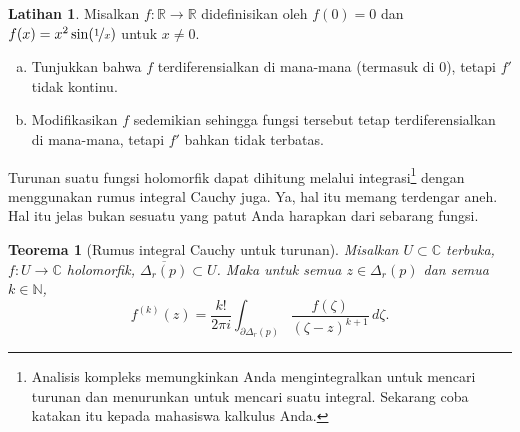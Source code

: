 \documentclass[12pt,openany]{book}
\newcommand{\C}{{\mathbb{C}}}
\newcommand{\R}{{\mathbb{R}}}
\newcommand{\N}{{\mathbb{N}}}
\theoremstyle{plain}
\newtheorem{thm}{Teorema}[section]
\theoremstyle{remark}
\theoremstyle{definition}
\newenvironment{exbox}{%
    \def\FrameCommand{\vrule width 1pt \relax\hspace{10pt}}%
    \MakeFramed{\advance\hsize-\width\FrameRestore}%
}{%
    \endMakeFramed
}
\newenvironment{exparts}{%
    \leavevmode\begin{enumerate}[a),noitemsep,topsep=0pt,parsep=0pt,partopsep=0pt]
}{%
    \end{enumerate}
}
\theoremstyle{exercise}
\newtheorem{exercise}{Latihan}[section]
\theoremstyle{example}
\begin{document}
\begin{exbox}
\begin{exercise}
Misalkan $f \colon \R \to \R$ didefinisikan oleh $f(0) = 0$ dan $f(x) = x^2
\sin( \nicefrac{1}{x} )$ untuk $x \neq 0$.
\begin{exparts}
\item
Tunjukkan bahwa $f$
terdiferensialkan di mana-mana (termasuk di $0$), tetapi $f'$ tidak kontinu.
\item
Modifikasikan $f$ sedemikian sehingga fungsi tersebut tetap terdiferensialkan di mana-mana, tetapi $f'$ bahkan
tidak terbatas.
\end{exparts}
\end{exercise}
\end{exbox}

Turunan suatu fungsi holomorfik dapat dihitung melalui
integrasi\footnote{Analisis kompleks memungkinkan Anda mengintegralkan untuk mencari
turunan dan menurunkan untuk mencari suatu integral.  Sekarang coba katakan itu kepada mahasiswa
kalkulus Anda.} dengan menggunakan rumus integral Cauchy juga.  Ya, hal itu memang terdengar
aneh.  Hal itu jelas bukan sesuatu yang patut Anda harapkan dari sebarang
fungsi.

\begin{thm}[Rumus integral Cauchy untuk turunan]
Misalkan $U \subset \C$ terbuka, $f \colon U \to \C$ holomorfik,
$\overline{\Delta_r(p)} \subset U$.
Maka untuk semua $z \in \Delta_r(p)$ dan semua $k \in \N$,
\begin{equation*}
f^{(k)}(z)
=
\frac{k!}{2\pi i}
\int_{\partial \Delta_r(p)}
\frac{f(\zeta)}{(\zeta-z)^{k+1}}
\,
d \zeta .
\end{equation*}
\end{thm}
\end{document}

